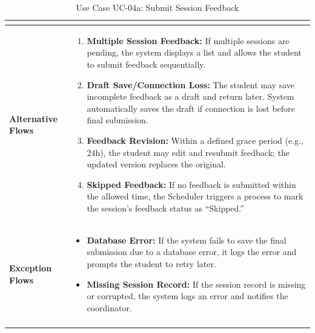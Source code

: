 \begin{center}
\begin{longtable}{|p{3cm}|p{11cm}|}
\begin{itemize}
\end{itemize} \\ 
\hline
\textbf{Alternative Flows} & 
\begin{enumerate}
    \item \textbf{Multiple Session Feedback:} If multiple sessions are pending, the system displays a list and allows the student to submit feedback sequentially.
    \item \textbf{Draft Save/Connection Loss:} The student may save incomplete feedback as a draft and return later. System automatically saves the draft if connection is lost before final submission.
    \item \textbf{Feedback Revision:} Within a defined grace period (e.g., 24h), the student may edit and resubmit feedback; the updated version replaces the original.
    \item \textbf{Skipped Feedback:} If no feedback is submitted within the allowed time, the Scheduler triggers a process to mark the session's feedback status as ``Skipped.'' 
\end{enumerate} \\ 
\hline
\textbf{Exception Flows} & 
\begin{itemize}
    \item \textbf{Database Error:} If the system fails to save the final submission due to a database error, it logs the error and prompts the student to retry later.
    \item \textbf{Missing Session Record:} If the session record is missing or corrupted, the system logs an error and notifies the coordinator.
\end{itemize} \\ 
\hline
\caption{Use Case UC-04a: Submit Session Feedback}
\end{longtable}
\end{center}

